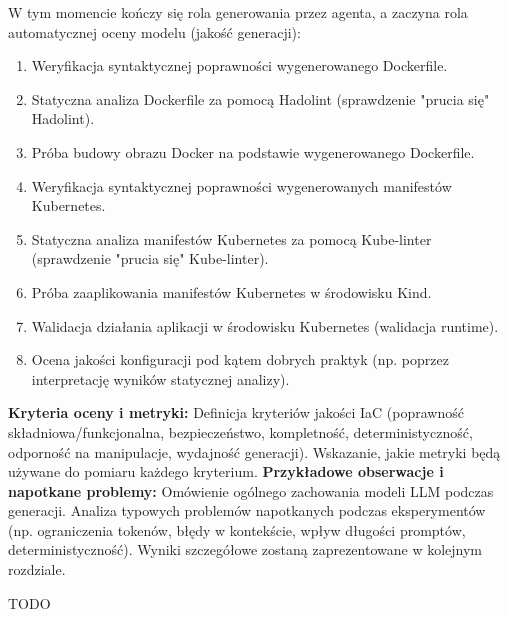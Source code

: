 W tym momencie kończy się rola generowania przez agenta, a zaczyna rola automatycznej oceny modelu (jakość generacji): \begin{enumerate}[resume] \item Weryfikacja syntaktycznej poprawności wygenerowanego Dockerfile. \item Statyczna analiza Dockerfile za pomocą Hadolint (sprawdzenie "prucia się" Hadolint). \item Próba budowy obrazu Docker na podstawie wygenerowanego Dockerfile. \item Weryfikacja syntaktycznej poprawności wygenerowanych manifestów Kubernetes. \item Statyczna analiza manifestów Kubernetes za pomocą Kube-linter (sprawdzenie "prucia się" Kube-linter). \item Próba zaaplikowania manifestów Kubernetes w środowisku Kind. \item Walidacja działania aplikacji w środowisku Kubernetes (walidacja runtime). \item Ocena jakości konfiguracji pod kątem dobrych praktyk (np. poprzez interpretację wyników statycznej analizy). \end{enumerate}
\textbf{Kryteria oceny i metryki:}
Definicja kryteriów jakości IaC (poprawność składniowa/funkcjonalna, bezpieczeństwo, kompletność, deterministyczność, odporność na manipulacje, wydajność generacji).
Wskazanie, jakie metryki będą używane do pomiaru każdego kryterium.
\textbf{Przykładowe obserwacje i napotkane problemy:}
Omówienie ogólnego zachowania modeli LLM podczas generacji.
Analiza typowych problemów napotkanych podczas eksperymentów (np. ograniczenia tokenów, błędy w kontekście, wpływ długości promptów, deterministyczność).
Wyniki szczegółowe zostaną zaprezentowane w kolejnym rozdziale.

TODO